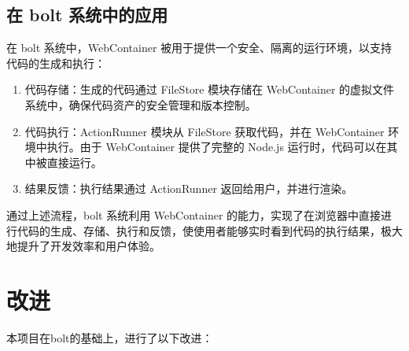 \subsection{在 bolt 系统中的应用}

在 bolt 系统中，WebContainer 被用于提供一个安全、隔离的运行环境，以支持代码的生成和执行：

\begin{enumerate}

    \item 代码存储：生成的代码通过 FileStore 模块存储在 WebContainer 的虚拟文件系统中，确保代码资产的安全管理和版本控制。

    \item 代码执行：ActionRunner 模块从 FileStore 获取代码，并在 WebContainer 环境中执行。由于 WebContainer 提供了完整的 Node.js 运行时，代码可以在其中被直接运行。

    \item 结果反馈：执行结果通过 ActionRunner 返回给用户，并进行渲染。
\end{enumerate}

通过上述流程，bolt 系统利用 WebContainer 的能力，实现了在浏览器中直接进行代码的生成、存储、执行和反馈，使使用者能够实时看到代码的执行结果，极大地提升了开发效率和用户体验。 

\section{改进}

本项目在bolt的基础上，进行了以下改进：

